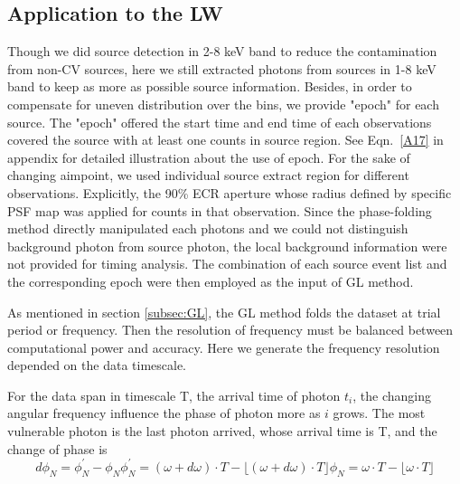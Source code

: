 \documentclass[twoside,twocolumn]{aastex63}
\begin{document}
\subsection{Application to the LW}\label{subsec:appli}
Though we did source detection in 2-8 keV band to reduce the contamination from non-CV sources, here we still extracted photons from sources in 1-8 keV band to keep as more as possible source information. 
Besides, in order to compensate for uneven distribution over the bins, we provide "epoch" for each source. The "epoch" offered the start time and end time of each observations covered the source with at least one counts in source region. See Eqn.~\ref{A17} in appendix for detailed illustration about the use of epoch. 
For the sake of changing aimpoint, we used individual source extract region for different observations. Explicitly, the 90\% ECR aperture  whose radius defined by specific PSF map was applied for counts in that observation. Since the phase-folding method directly manipulated each photons and we could not distinguish background photon from source photon, the local background information were not provided for timing analysis. The combination of each source event list and the corresponding epoch were then employed as the input of GL method. 

As mentioned in section \ref{subsec:GL}, the GL method folds the dataset at trial period or frequency. Then the resolution of frequency must be balanced between computational power and  accuracy. Here we generate the frequency resolution depended on the data timescale.

For the data span in timescale T, the arrival time of photon $t_i$, the changing angular frequency influence the phase of photon more as $i$ grows. The most vulnerable photon is the last photon arrived, whose arrival time is T, and the change of phase is
\begin{subequations}\label{fi}
\begin{equation}
	d\phi_{N}=\phi_{N}^{'}-\phi_{N}
\end{equation}
\begin{equation}
	\phi_{N}^{'}=(\omega +d\omega) \cdot T-\lfloor (\omega +d\omega) \cdot T \rfloor
\end{equation}
\begin{equation}
	\phi_{N}=\omega \cdot T-\lfloor \omega \cdot T \rfloor
\end{equation}
\end{subequations}
\\
\end{document}
